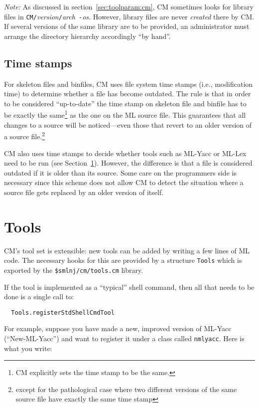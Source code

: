 \documentclass[titlepage,letterpaper]{article}
\begin{document}
{\em Note:} As discussed in section~\ref{sec:toolparam:cm}, CM sometimes
looks for library files in {\tt CM/}{\it version}{\tt /}{\it arch}{\tt
-}{\it os}.  However, library files are never {\em created} there by
CM.  If several versions of the same library are to be provided, an
administrator must arrange the directory hierarchy accordingly ``by
hand''.

\subsection{Time stamps}

For skeleton files and binfiles, CM uses file system time stamps
(i.e., modification time) to determine whether a file has become
outdated.  The rule is that in order to be considered ``up-to-date''
the time stamp on skeleton file and binfile has to be exactly the
same\footnote{CM explicitly sets the time stamp to be the same.} as
the one on the ML source file.  This guarantees that all changes to a
source will be noticed---even those that revert to an older version of
a source file.\footnote{except for the pathological case where two
different versions of the same source file have exactly the same time
stamp}

CM also uses time stamps to decide whether tools such as ML-Yacc or
ML-Lex need to be run (see Section~\ref{sec:tools}).  However, the
difference is that a file is considered outdated if it is older than
its source.  Some care on the programmers side is necessary since this
scheme does not allow CM to detect the situation where a source file
gets replaced by an older version of itself.

\section{Tools}
\label{sec:tools}

CM's tool set is extensible: new tools can be added by writing a few
lines of ML code.  The necessary hooks for this are provided by a
structure {\tt Tools} which is exported by the {\tt \$smlnj/cm/tools.cm}
library.

If the tool is implemented as a ``typical'' shell command, then all
that needs to be done is a single call to:

\begin{verbatim}
  Tools.registerStdShellCmdTool
\end{verbatim}

For example, suppose you have made a
new, improved version of ML-Yacc (``New-ML-Yacc'') and want to
register it under a class called {\tt nmlyacc}.  Here is what you
write:
\end{document}
